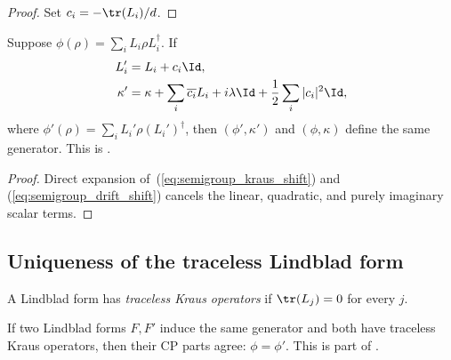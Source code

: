\begin{proof}
    \leanok
    Set $c_i = -\tr(L_i)/d$.
\end{proof}

\begin{theorem}
    \label{thm:generator_shift_invariance}
    \leanok
    Suppose $\phi(\rho)=\sum_iL_i\rho L_i^\dagger$. If
    \begin{align}
        L_i'&=L_i+c_i\Id, \label{eq:semigroup_kraus_shift}\\
        \kappa'&=\kappa+\sum_i\overline{c_i}L_i+i\lambda\Id
            +\frac12\sum_i|c_i|^2\Id,
            \label{eq:semigroup_drift_shift}
    \end{align}
    where $\phi'(\rho)=\sum_iL_i'\rho(L_i')^\dagger$, then
    $(\phi',\kappa')$ and $(\phi,\kappa)$ define the same generator.
    This is \cite[Proposition~7.4(1), Equations~(7.18)--(7.19)]{Wolf2012Quantum}.
\end{theorem}

\begin{proof}
    \leanok
    Direct expansion of~(\ref{eq:semigroup_kraus_shift}) and
    (\ref{eq:semigroup_drift_shift}) cancels the linear, quadratic, and
    purely imaginary scalar terms.
\end{proof}

\subsection{Uniqueness of the traceless Lindblad form}

\begin{definition}\label{def:has_traceless_kraus}
    \leanok
    A Lindblad form has \emph{traceless Kraus operators} if
    $\tr(L_j) = 0$ for every $j$.
\end{definition}

\begin{theorem}
    \label{thm:generatorDecomp_traceless_unique_phi}
    \leanok
    If two Lindblad forms $F,F'$ induce the same generator and
    both have traceless Kraus operators, then their CP parts agree:
    $\phi = \phi'$.
    This is part of \cite[Proposition~7.4(2)]{Wolf2012Quantum}.
\end{theorem}

